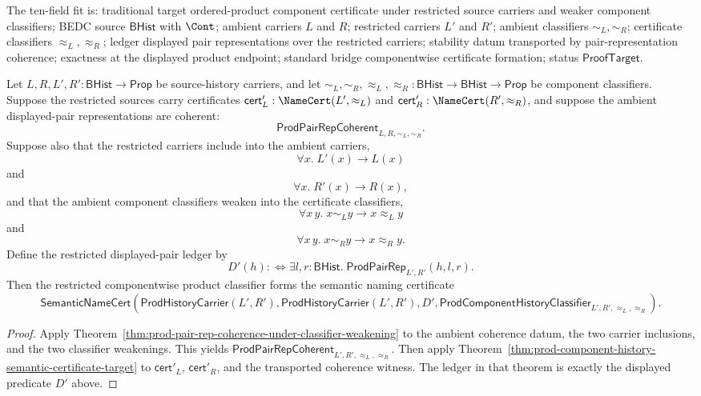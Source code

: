 \begin{theorem}
\label{thm:prod-componentwise-certificate-under-source-restriction}
The ten-field fit is: traditional target ordered-product component certificate
under restricted source carriers and weaker component classifiers; BEDC source
$\mathsf{BHist}$ with $\Cont$; ambient carriers $L$ and $R$; restricted carriers
$L'$ and $R'$; ambient classifiers $\sim_L,\sim_R$; certificate classifiers
$\approx_L,\approx_R$; ledger displayed pair representations over the restricted
carriers; stability datum transported by pair-representation coherence; exactness
at the displayed product endpoint; standard bridge componentwise certificate
formation; status $\mathsf{ProofTarget}$.

Let $L,R,L',R':\mathsf{BHist}\to\mathsf{Prop}$ be source-history carriers, and let
$\sim_L,\sim_R,\approx_L,\approx_R:\mathsf{BHist}\to\mathsf{BHist}\to\mathsf{Prop}$
be component classifiers. Suppose the restricted sources carry certificates
$\mathsf{cert}'_L:\NameCert(L',\approx_L)$ and
$\mathsf{cert}'_R:\NameCert(R',\approx_R)$, and suppose the ambient displayed-pair
representations are coherent:
$$
\mathsf{ProdPairRepCoherent}_{L,R,\sim_L,\sim_R}.
$$
Suppose also that the restricted carriers include into the ambient carriers,
$$
\forall x.\;L'(x)\to L(x)
$$
and
$$
\forall x.\;R'(x)\to R(x),
$$
and that the ambient component classifiers weaken into the certificate
classifiers,
$$
\forall x\,y.\;x\sim_L y\to x\approx_L y
$$
and
$$
\forall x\,y.\;x\sim_R y\to x\approx_R y.
$$
Define the restricted displayed-pair ledger by
$$
D'(h):\Longleftrightarrow
\exists l,r:\mathsf{BHist}.\;\mathsf{ProdPairRep}_{L',R'}(h,l,r).
$$
Then the restricted componentwise product classifier forms the semantic naming
certificate
$$
\mathsf{SemanticNameCert}(\mathsf{ProdHistoryCarrier}(L',R'),
\mathsf{ProdHistoryCarrier}(L',R'),
D',
\mathsf{ProdComponentHistoryClassifier}_{L',R',\approx_L,\approx_R}).
$$
\end{theorem}
\begin{proof}
Apply
Theorem~\ref{thm:prod-pair-rep-coherence-under-classifier-weakening} to the
ambient coherence datum, the two carrier inclusions, and the two classifier
weakenings. This yields
$\mathsf{ProdPairRepCoherent}_{L',R',\approx_L,\approx_R}$. Then apply
Theorem~\ref{thm:prod-component-history-semantic-certificate-target} to
$\mathsf{cert}'_L$, $\mathsf{cert}'_R$, and the transported coherence witness.
The ledger in that theorem is exactly the displayed predicate $D'$ above.
\end{proof}

